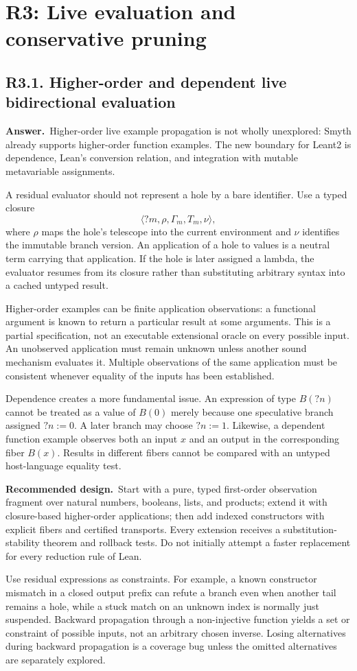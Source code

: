 \documentclass[11pt,a4paper]{article}
\newcommand{\qid}[3]{\subsection{#2. #3}\label{#1}}
\newcommand{\answer}{\noindent\textbf{Answer.}\ }
\newcommand{\proposal}{\noindent\textbf{Recommended design.}\ }
\theoremstyle{remark}
\begin{document}
\section{R3: Live evaluation and conservative pruning}\label{sec:r3}

\qid{q31}{R3.1}{Higher-order and dependent live bidirectional evaluation}
\answer Higher-order live example propagation is not wholly unexplored: Smyth already supports higher-order function examples. The new boundary for Leant2 is dependence, Lean's conversion relation, and integration with mutable metavariable assignments.~\cite{smyth}

A residual evaluator should not represent a hole by a bare identifier. Use a typed closure
\[
 \langle ?m,\rho,\Gamma_m,T_m,\nu\rangle,
\]
where $\rho$ maps the hole's telescope into the current environment and $\nu$ identifies the immutable branch version. An application of a hole to values is a neutral term carrying that application. If the hole is later assigned a lambda, the evaluator resumes from its closure rather than substituting arbitrary syntax into a cached untyped result.

Higher-order examples can be finite application observations: a functional argument is known to return a particular result at some arguments. This is a partial specification, not an executable extensional oracle on every possible input. An unobserved application must remain unknown unless another sound mechanism evaluates it. Multiple observations of the same application must be consistent whenever equality of the inputs has been established.

Dependence creates a more fundamental issue. An expression of type $B(?n)$ cannot be treated as a value of $B(0)$ merely because one speculative branch assigned $?n:=0$. A later branch may choose $?n:=1$. Likewise, a dependent function example observes both an input $x$ and an output in the corresponding fiber $B(x)$. Results in different fibers cannot be compared with an untyped host-language equality test.

\proposal Start with a pure, typed first-order observation fragment over natural numbers, booleans, lists, and products; extend it with closure-based higher-order applications; then add indexed constructors with explicit fibers and certified transports. Every extension receives a substitution-stability theorem and rollback tests. Do not initially attempt a faster replacement for every reduction rule of Lean.

Use residual expressions as constraints. For example, a known constructor mismatch in a closed output prefix can refute a branch even when another tail remains a hole, while a stuck match on an unknown index is normally just suspended. Backward propagation through a non-injective function yields a set or constraint of possible inputs, not an arbitrary chosen inverse. Losing alternatives during backward propagation is a coverage bug unless the omitted alternatives are separately explored.
\end{document}
